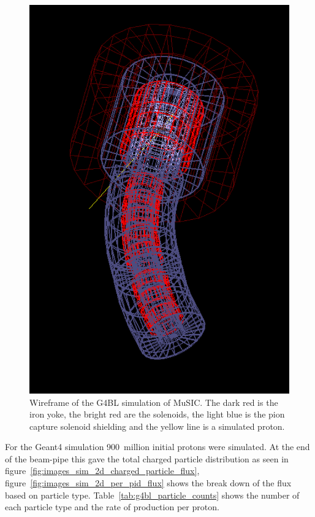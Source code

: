 \begin{figure}[h]
  \centering
    \includegraphics[width=.9\textwidth]{images/Geometry/g4bl_wireframe.png}
  \caption{Wireframe of the G4BL simulation of MuSIC. The dark red is the iron yoke, the bright red are the solenoids, the light blue is the pion capture solenoid shielding and the yellow line is a simulated proton.}
  \label{fig:images_Geometry_g4bl_wireframe}
\end{figure}

For the Geant4 simulation 900~million initial protons were simulated. At the end of the beam-pipe this gave the total charged particle distribution as seen in figure~\ref{fig:images_sim_2d_charged_particle_flux}, figure~\ref{fig:images_sim_2d_per_pid_flux} shows the break down of the flux based on particle type. Table~\ref{tab:g4bl_particle_counts} shows the number of each particle type and the rate of production per proton. 

